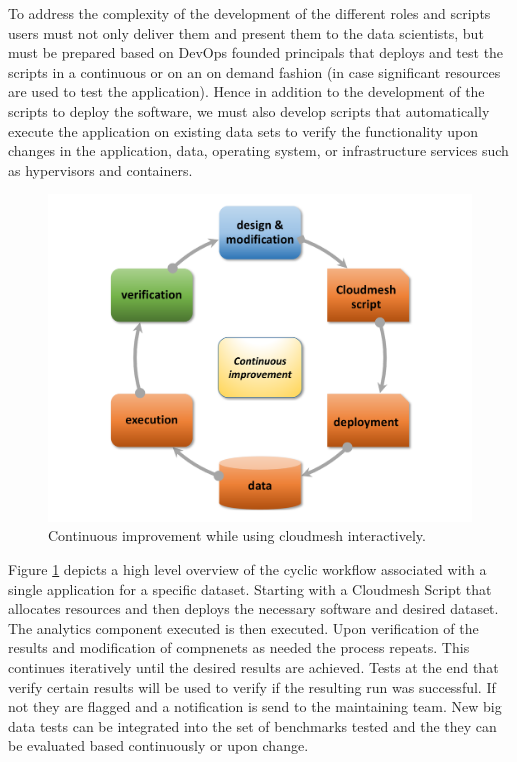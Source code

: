 \documentclass[9pt,twocolumn,twoside]{styles/osajnl}
\begin{document}
To address the complexity of the development of the different roles
and scripts users must not only deliver them and present them to the
data scientists, but must be prepared based on DevOps founded
principals that deploys and test the scripts in a continuous or on an
on demand fashion (in case significant resources are used to test the
application). Hence in addition to the development of the scripts to
deploy the software, we must also develop scripts that automatically
execute the application on existing data sets to verify the
functionality upon changes in the application, data, operating system,
or infrastructure services such as hypervisors and containers.


\begin{figure}[htb]
  \centering
      \includegraphics[width=1.0\columnwidth]{images/nist-devops-1.pdf}
  \caption{Continuous improvement while using cloudmesh interactively.}
  \label{F:NIST-devops-1}
\end{figure}


Figure \ref{F:NIST-devops-1} depicts a high level overview of the cyclic workflow
associated with a single application for a specific dataset. Starting
with a Cloudmesh Script that allocates resources and then deploys the
necessary software and desired dataset. The analytics component
executed is then executed. Upon verification of the results and
modification of compnenets as needed the process repeats. This
continues iteratively until the desired results are achieved. Tests at
the end that verify certain results will be used to verify if the
resulting run was successful. If not they are flagged and a
notification is send to the maintaining team. New big data tests can
be integrated into the set of benchmarks tested and the they can be
evaluated based continuously or upon change.
\end{document}
